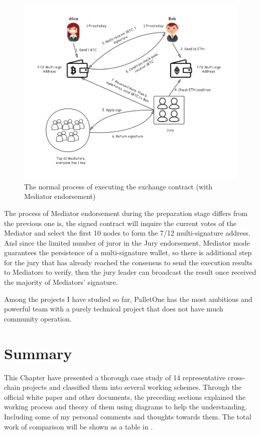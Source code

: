 \begin{figure}[H]
    \includegraphics[width=1\textwidth]{./figures/mediator.png}
    \centering
    \caption{The normal process of executing the exchange contract (with Mediator endorsement) \protect\footnotemark}
    \label{fig:mediator}
    \centering
\end{figure}
\noindent The process of Mediator endorsement during the preparation stage differs from the previous one is, the signed contract will inquire the current votes of the Mediator and select the first 10 nodes to form the 7/12 multi-signature address. And since the limited number of juror in the Jury endorsement, Mediator mode guarantees the persistence of a multi-signature wallet, so there is additional step for the jury that has already reached the consensus to send the execution results to Mediators to verify, then the jury leader can broadcast the result once received the majority of Mediators' signature.

\noindent Among the projects I have studied so far, PalletOne has the most ambitious and powerful team with a purely technical project that does not have much community operation.






\section{Summary}
\noindent This Chapter have presented a thorough case study of 14 representative cross-chain projects and classified them into several working schemes. Through the official white paper and other documents, the preceding sections explained the working process and theory of them using diagrams to help the understanding. Including some of my personal comments and thoughts towards them. The total work of comparison will be shown as a table in .

